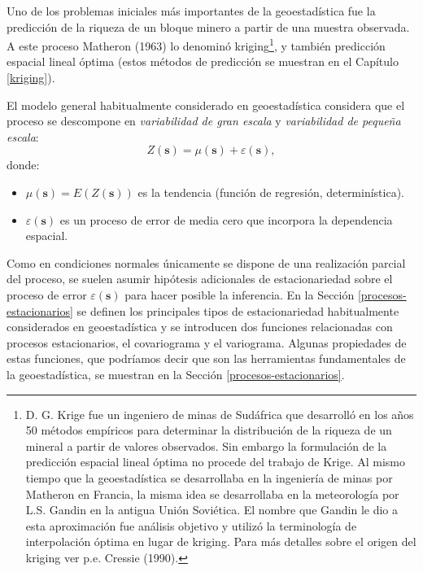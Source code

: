 \documentclass[
  spanish,
]{book}
\theoremstyle{break}
\theoremstyle{definition}
\theoremstyle{definition}
\theoremstyle{definition}
\theoremstyle{definition}
\theoremstyle{remark}
\begin{document}
Uno de los problemas iniciales más importantes de la geoestadística fue la predicción de la riqueza de un bloque minero a partir de una muestra observada.
A este proceso Matheron (1963) lo denominó kriging\footnote{D. G. Krige fue un ingeniero de minas de Sudáfrica que desarrolló
  en los años 50 métodos empíricos para determinar la distribución de
  la riqueza de un mineral a partir de valores observados.
  Sin embargo la formulación de la predicción espacial lineal óptima no
  procede del trabajo de Krige.
  Al mismo tiempo que la geoestadística se desarrollaba en la ingeniería
  de minas por Matheron en Francia, la misma idea se desarrollaba en la
  meteorología por L.S. Gandin en la antigua Unión Soviética.
  El nombre que Gandin le dio a esta aproximación fue análisis objetivo
  y utilizó la terminología de interpolación óptima en lugar de kriging.
  Para más detalles sobre el origen del kriging ver p.e. Cressie (1990).}, y también predicción espacial lineal óptima (estos métodos de predicción se muestran en el Capítulo \ref{kriging}).

El modelo general habitualmente considerado en geoestadística considera que el proceso se descompone en \emph{variabilidad de gran escala} y \emph{variabilidad de pequeña escala}:
\begin{equation}
  Z(\mathbf{s}) = \mu(\mathbf{s}) + \varepsilon(\mathbf{s}),
  \label{eq:modelogeneral}
\end{equation}
donde:

\begin{itemize}
\item
  \(\mu(\mathbf{s}) = E \left( Z(\mathbf{s}) \right)\) es la tendencia (función de regresión, determinística).
\item
  \(\varepsilon(\mathbf{s})\) es un proceso de error de media cero que incorpora la dependencia espacial.
\end{itemize}

Como en condiciones normales únicamente se dispone de una realización parcial del proceso, se suelen asumir hipótesis adicionales de estacionariedad sobre el proceso de error \(\varepsilon(\mathbf{s})\) para hacer posible la inferencia.
En la Sección \ref{procesos-estacionarios} se definen los principales tipos de estacionariedad habitualmente considerados en geoestadística y se introducen dos funciones relacionadas con procesos estacionarios, el covariograma y el variograma.
Algunas propiedades de estas funciones, que podríamos decir que son las herramientas fundamentales de la geoestadística, se muestran en la Sección \ref{procesos-estacionarios}.
\end{document}
